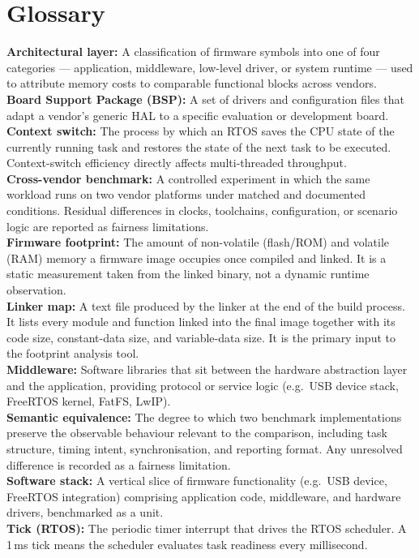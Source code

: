 \chapter{Glossary}
\label{chap:glossary}

\textbf{Architectural layer:} A classification of firmware symbols into one of four categories --- application, middleware, low-level driver, or system runtime --- used to attribute memory costs to comparable functional blocks across vendors.\\

\textbf{Board Support Package (BSP):} A set of drivers and configuration files that adapt a vendor's generic HAL to a specific evaluation or development board.\\

\textbf{Context switch:} The process by which an RTOS saves the CPU state of the currently running task and restores the state of the next task to be executed. Context-switch efficiency directly affects multi-threaded throughput.\\

\textbf{Cross-vendor benchmark:} A controlled experiment in which the same workload runs on two vendor platforms under matched and documented conditions. Residual differences in clocks, toolchains, configuration, or scenario logic are reported as fairness limitations.\\

\textbf{Firmware footprint:} The amount of non-volatile (flash/ROM) and volatile (RAM) memory a firmware image occupies once compiled and linked. It is a static measurement taken from the linked binary, not a dynamic runtime observation.\\

\textbf{Linker map:} A text file produced by the linker at the end of the build process. It lists every module and function linked into the final image together with its code size, constant-data size, and variable-data size. It is the primary input to the footprint analysis tool.\\

\textbf{Middleware:} Software libraries that sit between the hardware abstraction layer and the application, providing protocol or service logic (e.g.\ USB device stack, FreeRTOS kernel, FatFS, LwIP).\\

\textbf{Semantic equivalence:} The degree to which two benchmark implementations preserve the observable behaviour relevant to the comparison, including task structure, timing intent, synchronisation, and reporting format. Any unresolved difference is recorded as a fairness limitation.\\

\textbf{Software stack:} A vertical slice of firmware functionality (e.g.\ USB device, FreeRTOS integration) comprising application code, middleware, and hardware drivers, benchmarked as a unit.\\

\textbf{Tick (RTOS):} The periodic timer interrupt that drives the RTOS scheduler. A 1\,ms tick means the scheduler evaluates task readiness every millisecond.\\

\pagebreak